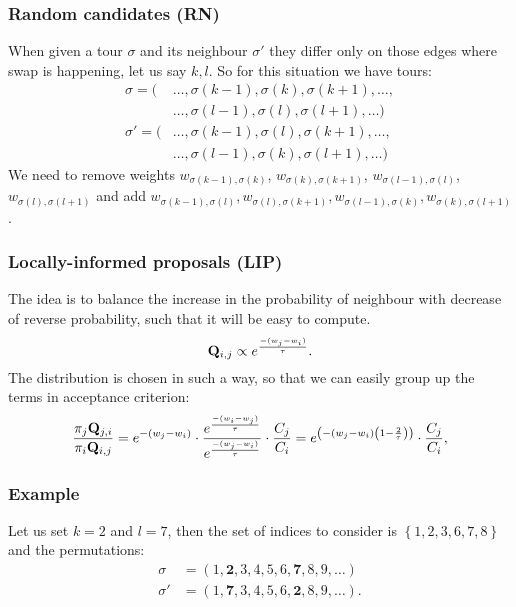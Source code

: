 \begin{frame}
	\frametitle{Random candidates (RN)}
	When given a tour $\sigma$ and its neighbour $\sigma'$ they differ only on those edges where swap is happening, let us say $k,l$. So for this situation we have tours:
	\begin{align*}
		\sigma = (&\ldots, \sigma(k-1), \sigma(k), \sigma(k+1), \ldots, \\
		&\ldots, \sigma(l-1), \sigma(l), \sigma(l+1), \ldots) \\
		\sigma' = (&\ldots, \sigma(k-1), \sigma(l), \sigma(k+1), \ldots, \\
		&\ldots, \sigma(l-1), \sigma(k), \sigma(l+1), \ldots)
	\end{align*}
	We need to remove weights $w_{\sigma(k-1), \sigma(k)}$, $w_{\sigma(k), \sigma(k+1)}$, $w_{\sigma(l-1), \sigma(l)}$, $w_{\sigma(l), \sigma(l+1)}$ and add $w_{\sigma(k-1), \sigma(l)}, w_{\sigma(l), \sigma(k+1)}, w_{\sigma(l-1), \sigma(k)}, w_{\sigma(k), \sigma(l+1)}$.
\end{frame}

\begin{frame}
	\frametitle{Locally-informed proposals (LIP)}
	The idea is to balance the increase in the probability of neighbour with decrease of reverse probability, such that it will be easy to compute.
	\begin{equation*}
		\mathbf{Q}_{i,j} \propto e^\frac{-(w_{j} - w_i)}{\tau}.
	\end{equation*}
	The distribution is chosen in such a way, so that we can easily group up the terms in acceptance criterion:
	\begin{equation*}
		\frac{\pi_j \mathbf{Q}_{j,i}}{\pi_i \mathbf{Q}_{i,j}} = e^{-(w_j-w_i)} \cdot \frac{e^\frac{-(w_{i} - w_j)}{\tau}}{e^\frac{-(w_{j} - w_i)}{\tau}} \cdot \frac{C_j}{C_i} = e^{\left( -(w_j-w_i) \left(1 - \frac{2}{\tau}\right) \right)} \cdot \frac{C_j}{C_i},
	\end{equation*}
\end{frame}



\begin{frame}
	\frametitle{Example}
	Let us set $k=2$ and $l=7$, then the set of indices to consider is $\left\{ 1,2,3,6,7,8 \right\}$ and the permutations:
	\begin{align*}
	\sigma &= (1, \bm{2}, 3, 4, 5, 6, \bm{7}, 8, 9, \ldots) \\
	\sigma' &= (1, \bm{7}, 3, 4, 5, 6, \bm{2}, 8, 9, \ldots).
	\end{align*}
\end{frame}

